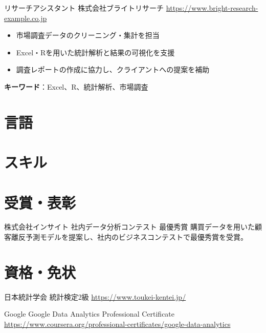 \documentclass[a4paper, serif, 10pt]{moderncv}
\begin{document}
        {リサーチアシスタント}
        {株式会社ブライトリサーチ}
        {\url{https://www.bright-research-example.co.jp}}
        {}
        {\begin{itemize}
\item 市場調査データのクリーニング・集計を担当
\item Excel・Rを用いた統計解析と結果の可視化を支援
\item 調査レポートの作成に協力し、クライアントへの提案を補助
\end{itemize}
\textbf{キーワード}：Excel、R、統計解析、市場調査}
\section{言語}

\section{スキル}

\section{受賞・表彰}

        {株式会社インサイト}
        {社内データ分析コンテスト 最優秀賞}
        {}
        {}
        {購買データを用いた顧客離反予測モデルを提案し、社内のビジネスコンテストで最優秀賞を受賞。}
\section{資格・免状}

        {日本統計学会}
        {統計検定2級}
        {\url{https://www.toukei-kentei.jp/}}
        {}
        {}

        {Google}
        {Google Data Analytics Professional Certificate}
        {\url{https://www.coursera.org/professional-certificates/google-data-analytics}}
        {}
        {}
\end{document}
